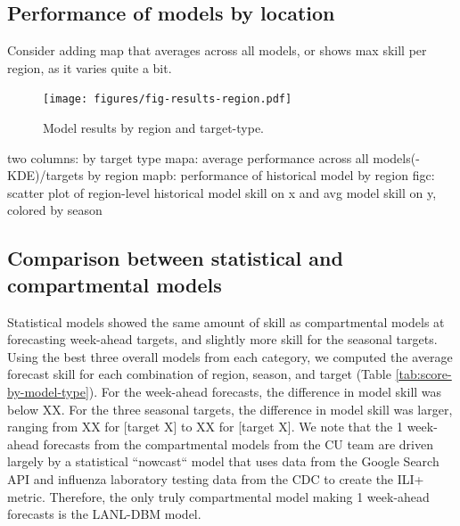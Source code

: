\documentclass{article}
\begin{document}
\subsection{Performance of models by location}

Consider adding map that averages across all models, or shows max skill per region, as it varies quite a bit.

\begin{figure}[htbp]
\begin{center}
\texttt{[image: figures/fig-results-region.pdf]}
\caption{Model results by region and target-type.}
\label{fig:results-region}
\end{center}
\end{figure}


two columns: by target type
mapa: average performance across all models(-KDE)/targets by region
mapb: performance of historical model by region
figc: scatter plot of region-level historical model skill on x and avg model skill on y, colored by season


\subsection{Comparison between statistical and compartmental models}


Statistical models showed the same amount of skill as compartmental models at forecasting week-ahead targets, and slightly more skill for the seasonal targets. 
Using the best three overall models from each category, we computed the average forecast skill for each combination of region, season, and target (Table \ref{tab:score-by-model-type}). 
For the week-ahead forecasts, the difference in model skill was below XX.
For the three seasonal targets, the difference in model skill was larger, ranging from XX for [target X] to XX for [target X].
We note that the 1 week-ahead forecasts from the compartmental models from the CU team are driven largely by a statistical ``nowcast`` model that uses data from the Google Search API and influenza laboratory testing data from the CDC to create the ILI+ metric.\cite{yang2014}
Therefore, the only truly compartmental model making 1 week-ahead forecasts is the LANL-DBM model. 




% 
\end{document}
